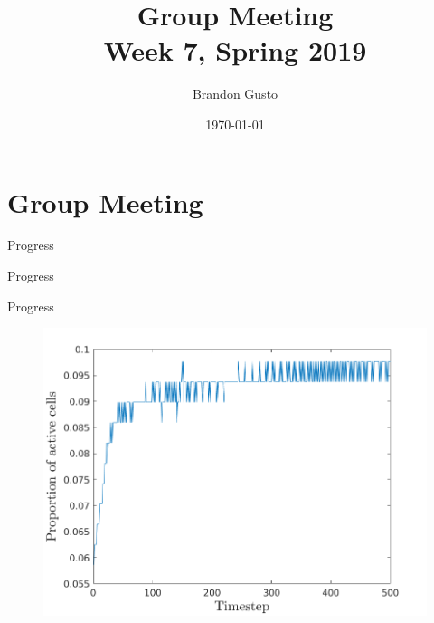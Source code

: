 \documentclass{beamer}
\begin{document}
\section{Group Meeting}
\title{Group Meeting \\ Week 7, Spring 2019}
\author{Brandon Gusto} %
\date{\today}
\frame{\titlepage}

\begin{frame}{Progress}
  \begin{figure}
    \center
  \end{figure}
\end{frame}

\begin{frame}{Progress}
  \begin{figure}
    \center
  \end{figure}
\end{frame}

\begin{frame}{Progress}
  \begin{figure}
    \center
    \includegraphics[scale=0.5]{numactive.png}
  \end{figure}
\end{frame}
\end{document}

